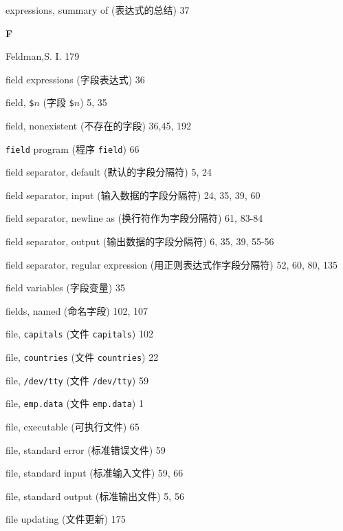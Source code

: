 \begin{multicols}{2}
\hangindent=2pc  expressions, summary of (表达式的总结) 37

\medskip\textbf{\large{F}}

\hangindent=2pc  Feldman,S. I. 179

\hangindent=2pc  field expressions (字段表达式) 36

\hangindent=2pc  field, \verb'$'$n$ (字段 \verb'$'$n$) 5, 35

\hangindent=2pc  field, nonexistent (不存在的字段) 36,45, 192

\hangindent=2pc  \verb'field' program (程序 \verb'field') 66

\hangindent=2pc  field separator, default (默认的字段分隔符) 5, 24

\hangindent=2pc  field separator, input (输入数据的字段分隔符)
24, 35, 39, 60

\hangindent=2pc  field separator, newline as
(换行符作为字段分隔符) 61, 83-84

\hangindent=2pc  field separator, output (输出数据的字段分隔符)
6, 35, 39, 55-56

\hangindent=2pc  field separator, regular expression
(用正则表达式作字段分隔符) 52, 60, 80, 135

\hangindent=2pc  field variables (字段变量) 35

\hangindent=2pc  fields, named (命名字段) 102, 107

\hangindent=2pc  file, \verb'capitals' (文件 \verb'capitals') 102

\hangindent=2pc  file, \verb'countries' (文件 \verb'countries') 22

\hangindent=2pc  file, \verb'/dev/tty' (文件 \verb'/dev/tty') 59

\hangindent=2pc  file, \verb'emp.data' (文件 \verb'emp.data') 1

\hangindent=2pc  file, executable (可执行文件) 65

\hangindent=2pc  file, standard error (标准错误文件) 59

\hangindent=2pc  file, standard input (标准输入文件) 59, 66

\hangindent=2pc  file, standard output (标准输出文件) 5, 56

\hangindent=2pc  file updating (文件更新) 175


\end{multicols}
